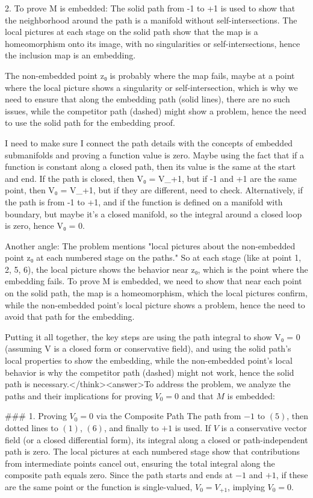 2. To prove M is embedded: The solid path from -1 to +1 is used to show that the neighborhood around the path is a manifold without self-intersections. The local pictures at each stage on the solid path show that the map is a homeomorphism onto its image, with no singularities or self-intersections, hence the inclusion map is an embedding.

The non-embedded point z₀ is probably where the map fails, maybe at a point where the local picture shows a singularity or self-intersection, which is why we need to ensure that along the embedding path (solid lines), there are no such issues, while the competitor path (dashed) might show a problem, hence the need to use the solid path for the embedding proof.

I need to make sure I connect the path details with the concepts of embedded submanifolds and proving a function value is zero. Maybe using the fact that if a function is constant along a closed path, then its value is the same at the start and end. If the path is closed, then V₀ = V_+1, but if -1 and +1 are the same point, then V₀ = V_+1, but if they are different, need to check. Alternatively, if the path is from -1 to +1, and if the function is defined on a manifold with boundary, but maybe it's a closed manifold, so the integral around a closed loop is zero, hence V₀ = 0.

Another angle: The problem mentions "local pictures about the non-embedded point z₀ at each numbered stage on the paths." So at each stage (like at point 1, 2, 5, 6), the local picture shows the behavior near z₀, which is the point where the embedding fails. To prove M is embedded, we need to show that near each point on the solid path, the map is a homeomorphism, which the local pictures confirm, while the non-embedded point's local picture shows a problem, hence the need to avoid that path for the embedding.

Putting it all together, the key steps are using the path integral to show V₀ = 0 (assuming V is a closed form or conservative field), and using the solid path's local properties to show the embedding, while the non-embedded point's local behavior is why the competitor path (dashed) might not work, hence the solid path is necessary.</think><answer>To address the problem, we analyze the paths and their implications for proving \( V_0 = 0 \) and that \( M \) is embedded:  

### 1. Proving \( V_0 = 0 \) via the Composite Path  
The path from \(-1\) to \((5)\), then dotted lines to \((1)\), \((6)\), and finally to \(+1\) is used. If \( V \) is a conservative vector field (or a closed differential form), its integral along a closed or path-independent path is zero. The local pictures at each numbered stage show that contributions from intermediate points cancel out, ensuring the total integral along the composite path equals zero. Since the path starts and ends at \(-1\) and \(+1\), if these are the same point or the function is single-valued, \( V_0 = V_{+1} \), implying \( V_0 = 0 \).  

